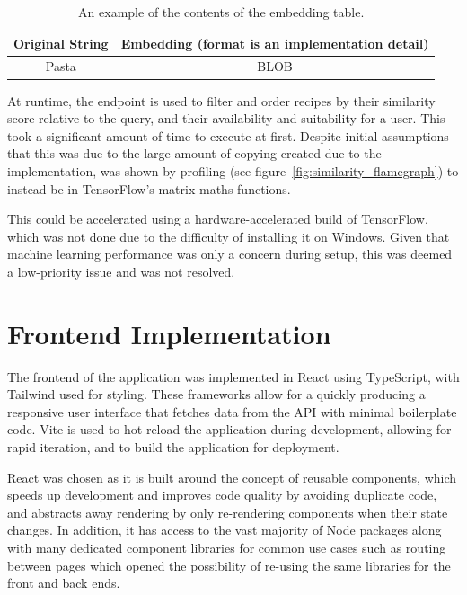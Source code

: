 \begin{table}[h]
    \centering
    \caption{\label{fig:embedding_table}An example of the contents of the embedding table.}
    \begin{tabular}{cc}
        \toprule
        \textbf{Original String} & \textbf{Embedding (format is an implementation detail)} \\\midrule
        Pasta & BLOB \\\bottomrule
    \end{tabular}
\end{table}

At runtime, the  endpoint is used to filter and order recipes by their similarity score
relative to the query, and their availability and suitability for a user.
This took a significant amount of time to execute at first. Despite initial assumptions that this was due to the large amount of copying
created due to the implementation, was shown by profiling (see figure~\ref{fig:similarity_flamegraph}) to instead be in TensorFlow's
matrix maths functions.

This could be accelerated using a hardware-accelerated build of TensorFlow, which was not done due to the difficulty of installing
it on Windows. Given that machine learning performance was only a concern during setup, this was deemed a low-priority
issue and was not resolved.

\section{Frontend Implementation}

The frontend of the application was implemented in React using TypeScript, with Tailwind used for styling. These
frameworks allow for a quickly producing a responsive user interface that fetches data from the API with minimal
boilerplate code. Vite is used to hot-reload the application during development, allowing for rapid iteration, and
to build the application for deployment.

React was chosen as it is built around the concept of reusable components, which speeds up development and
improves code quality by avoiding duplicate code,~\cite{hordijk_harmfulness_2009} and abstracts away rendering
by only re-rendering components when their state changes. In addition, it has access to the vast majority of
Node packages along with many dedicated component libraries for common use cases such as routing between pages
which opened the possibility of re-using the same libraries for the front and back ends.~\cite{saks_javascript_2019}

